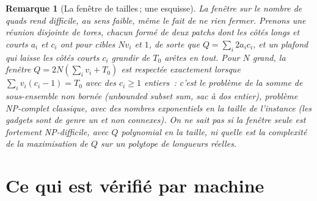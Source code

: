 \documentclass[11pt,a4paper]{article}
\newtheorem{remark}{Remarque}
\newenvironment{evidence}[3][]{}{}
\begin{document}
\begin{evidence}{open}{une esquisse}
\begin{remark}[La fenêtre de tailles\,; une esquisse]
La fenêtre sur le nombre de quads rend difficile, au sens faible, même le
fait de ne rien fermer. Prenons une réunion disjointe de tores, chacun formé
de deux patchs dont les côtés longs et courts $a_i$ et $c_i$ ont pour cibles
$N v_i$ et $1$, de sorte que $Q = \sum_i 2 a_i c_i$, et un plafond qui laisse les côtés courts $c_i$ grandir
de $T_0$ arêtes en tout. Pour $N$ grand, la fenêtre $Q = 2N(\sum_i v_i +
T_0)$ est respectée exactement lorsque $\sum_i v_i(c_i - 1) = T_0$ avec des
$c_i \ge 1$ entiers~: c'est le problème de la somme de sous-ensemble non
bornée (\emph{unbounded subset sum}, sac à dos entier), problème NP-complet
classique, avec
des nombres exponentiels en la taille de l'instance (les gadgets sont de genre
un et non connexes). On ne sait pas si la fenêtre seule est fortement
NP-difficile, avec $Q$ polynomial en la taille, ni quelle est la complexité de
la maximisation de $Q$ sur un polytope de longueurs réelles.
\end{remark}
\end{evidence}

\section{Ce qui est vérifié par machine}\label{sec:lean}
\end{document}
